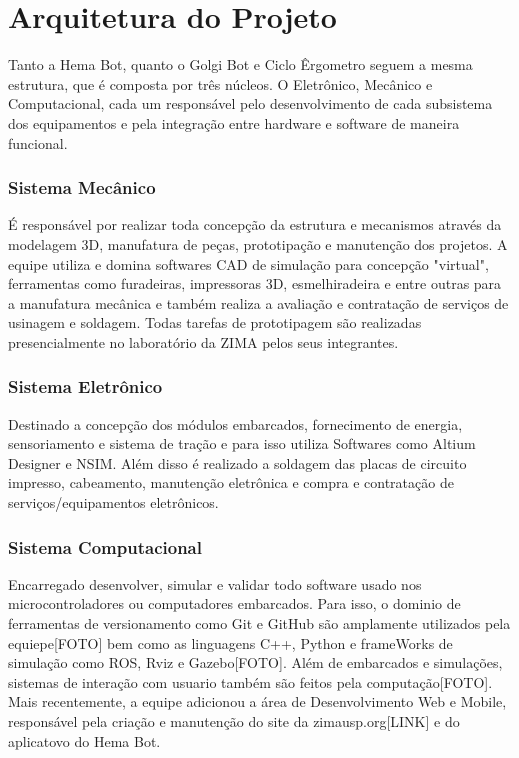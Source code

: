 \documentclass[../poliXuniversity_hospital_(USP)_report.tex]{subfiles}
\begin{document}
\chapter{Arquitetura do Projeto}

Tanto a Hema Bot, quanto o Golgi Bot e Ciclo Êrgometro seguem a mesma estrutura, que é composta por três núcleos. O Eletrônico, Mecânico e Computacional, cada um responsável pelo desenvolvimento de cada subsistema dos equipamentos e pela integração entre hardware e software de maneira funcional.

\subsection{Sistema Mecânico}

É responsável por realizar toda concepção da estrutura e mecanismos através da modelagem 3D, manufatura de peças, prototipação e manutenção dos projetos. A equipe utiliza e domina softwares CAD de simulação para concepção "virtual", ferramentas como furadeiras, impressoras 3D, esmelhiradeira e entre outras para a manufatura mecânica e também realiza a avaliação e contratação de serviços de usinagem e soldagem. Todas tarefas de prototipagem são realizadas presencialmente no laboratório da ZIMA pelos seus integrantes.

\subsection{Sistema Eletrônico}

Destinado a concepção dos módulos embarcados, fornecimento de energia, sensoriamento e sistema de tração e para isso utiliza Softwares como Altium Designer e NSIM. Além disso é realizado a soldagem das placas de circuito impresso, cabeamento, manutenção eletrônica e compra e contratação de serviços/equipamentos eletrônicos.

\subsection{Sistema Computacional}

Encarregado desenvolver, simular e validar todo software usado nos microcontroladores ou computadores embarcados. Para isso, o dominio de ferramentas de versionamento como Git e GitHub são amplamente utilizados pela equiepe[FOTO] bem como as linguagens C++, Python e frameWorks de simulação como ROS, Rviz e Gazebo[FOTO]. Além de embarcados e simulações, sistemas de interação com usuario também são feitos pela computação[FOTO]. Mais recentemente, a equipe adicionou a área de Desenvolvimento Web e Mobile, responsável pela criação e manutenção do site da zimausp.org[LINK] e do aplicatovo do Hema Bot.
\end{document}
